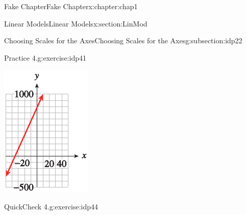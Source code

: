 \documentclass[oneside,10pt,]{book}
\numberwithin{equation}{section}
\begin{document}
\begin{chapterptx}{Fake Chapter}{}{Fake Chapter}{}{}{x:chapter:chap1}
\begin{sectionptx}{Linear Models}{}{Linear Models}{}{}{x:section:LinMod}
\begin{subsectionptx}{Choosing Scales for the Axes}{}{Choosing Scales for the Axes}{}{}{g:subsection:idp22}
\begin{inlineexercise}{Practice 4.}{g:exercise:idp41}
\begin{sidebyside}{1}{0.05}{0.65}{0}
\begin{sbspanel}{0.25}
\includegraphics[width=\linewidth]{external/photos/fig-in-ex-ans-1-1-4c.pdf}
\end{sbspanel}%
\end{sidebyside}%
\par
\end{inlineexercise}%
\begin{inlineexercise}{QuickCheck 4.}{g:exercise:idp44}%
\begin{sidebyside}{1}{0.3}{0.3}{0}%
\begin{sbspanel}{0.4}%
\end{sbspanel}
\end{sidebyside}
\end{inlineexercise}
\end{subsectionptx}
\end{sectionptx}
\end{chapterptx}
\end{document}
